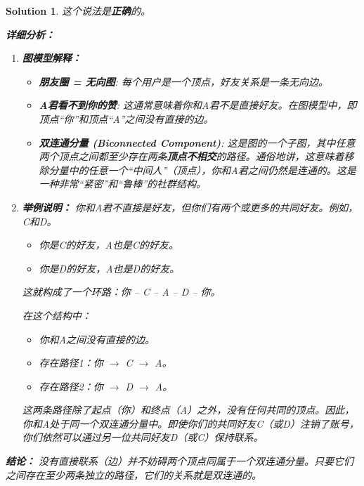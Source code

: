 \documentclass[UTF8]{report}
\newtheorem{solution}{Solution}
\theoremstyle{MyLineTheoremStyle} %
\theoremstyle{MyBlockTheoremStyle} %
\theoremstyle{MySubsubsectionStyle} %
\begin{document}
\begin{solution}
这个说法是\textbf{正确}的。

\textbf{详细分析：}

\begin{enumerate}
    \item \textbf{图模型解释：}
    \begin{itemize}
        \item \textbf{朋友圈 = 无向图}: 每个用户是一个顶点，好友关系是一条无向边。
        \item \textbf{A君看不到你的赞}: 这通常意味着你和A君不是直接好友。在图模型中，即顶点“你”和顶点“A”之间没有直接的边。
        \item \textbf{双连通分量 (Biconnected Component)}: 这是图的一个子图，其中任意两个顶点之间都至少存在两条\textbf{顶点不相交}的路径。通俗地讲，这意味着移除分量中的任意一个“中间人”（顶点），你和A君之间仍然是连通的。这是一种非常“紧密”和“鲁棒”的社群结构。
    \end{itemize}

    \item \textbf{举例说明：}
    你和A君不直接是好友，但你们有两个或更多的共同好友。例如，C和D。
    \begin{itemize}
        \item 你是C的好友，A也是C的好友。
        \item 你是D的好友，A也是D的好友。
    \end{itemize}
    这就构成了一个环路：你 -- C -- A -- D -- 你。

    \begin{center}
    \end{center}

    在这个结构中：
    \begin{itemize}
        \item 你和A之间没有直接的边。
        \item 存在路径1：你 $\to$ C $\to$ A。
        \item 存在路径2：你 $\to$ D $\to$ A。
    \end{itemize}
    这两条路径除了起点（你）和终点（A）之外，没有任何共同的顶点。因此，你和A处于同一个双连通分量中。即使你们的共同好友C（或D）注销了账号，你们依然可以通过另一位共同好友D（或C）保持联系。
\end{enumerate}

\textbf{结论：}
没有直接联系（边）并不妨碍两个顶点同属于一个双连通分量。只要它们之间存在至少两条独立的路径，它们的关系就是双连通的。
\end{solution}
\end{document}
